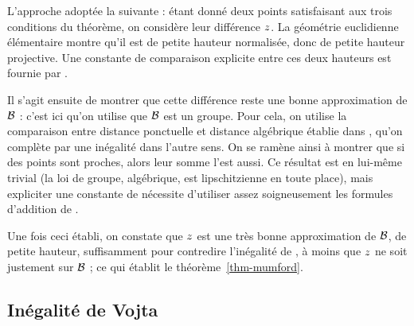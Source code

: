 \documentclass{mpg-preth}
\begin{document}
L'approche adoptée la suivante : étant donné deux points satisfaisant aux
trois conditions du théorème, on considère leur différence $z$. La
géométrie euclidienne élémentaire montre qu'il est de petite hauteur
normalisée, donc de petite hauteur projective. Une constante de comparaison
explicite entre ces deux hauteurs est fournie par \cite{daphimhva2}.

Il s'agit ensuite de montrer que cette différence reste une bonne
approximation de $\mathcal B$ : c'est ici qu'on utilise que $\mathcal B$ est un groupe.
Pour cela, on utilise la comparaison entre distance ponctuelle et distance
algébrique établie dans \cite[p. 103]{phidg}, qu'on complète par une inégalité
dans l'autre sens.  On se ramène ainsi à montrer que si des points sont
proches, alors leur somme l'est aussi. Ce résultat est en lui-même trivial (la
loi de groupe, algébrique, est lipschitzienne en toute place), mais expliciter
une constante de  nécessite d'utiliser assez soigneusement les
formules d'addition de \cite{daphimhva2}.

Une fois ceci établi, on constate que $z$ est une très bonne
approximation de $\mathcal B$, de petite hauteur, suffisamment pour contredire
l'inégalité de , à moins que $z$ ne soit justement sur
$\mathcal B$ ; ce qui établit le théorème~\ref{thm-mumford}.

\subsection{Inégalité de Vojta}
\end{document}
